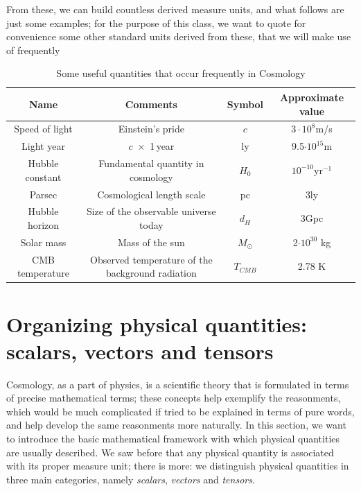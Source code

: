 \noindent From these, we can build countless derived measure units, and what follows are just some examples; for the purpose of this class, we want to quote for convenience some other standard units derived from these, that we will make use of frequently
\begin{table}[htbp]
\begin{center}
\begin{tabular}{|c|c|c|c|} \hline
\textbf{Name} & \textbf{Comments} & \textbf{Symbol} & \textbf{Approximate value} \\ \hline
Speed of light &Einstein's pride & $c$ & $3\cdot 10^8$m/s \\ \hline
Light year &$c\,\,\times$ 1\,year& ly & 9.5$\cdot10^{15}$m\\ \hline
Hubble constant &Fundamental quantity in cosmology&$H_0$&$10^{-10}$yr$^{-1}$\\ \hline
Parsec &Cosmological length scale& pc & 3ly \\ \hline
Hubble horizon &Size of the observable universe today& $d_H$&3Gpc\\ \hline 
Solar mass & Mass of the sun & $M_\odot$ & 2$\cdot10^{30}$ kg\\ \hline
CMB temperature &Observed temperature of the background radiation&$T_{CMB}$&2.78 K \\ \hline 

\end{tabular}
\end{center}
\caption{Some useful quantities that occur frequently in Cosmology}
\end{table}

\section{Organizing physical quantities: scalars, vectors and tensors}
Cosmology, as a part of physics, is a scientific theory that is formulated in terms of precise mathematical terms; these concepts help exemplify the reasonments, which would be much complicated if tried to be explained in terms of pure words, and help develop the same reasonments more naturally. In this section, we want to introduce the basic mathematical framework with which physical quantities are usually described. We saw before that any physical quantity is associated with its proper measure unit; there is more: we distinguish physical quantities in three main categories, namely \textit{scalars}, \textit{vectors} and \textit{tensors}. 
